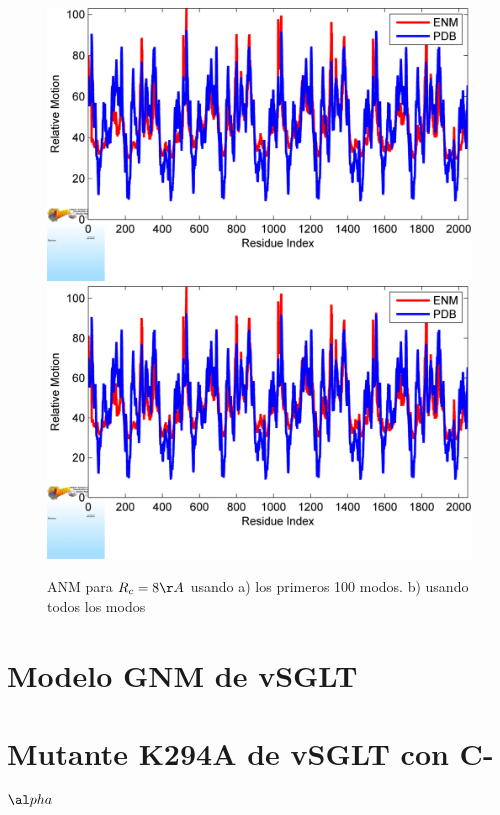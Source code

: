 \begin{figure}
 \centering
  \includegraphics[scale=0.3]{./Kap4/ANM/Ca/BF_plot_100.png}
 \includegraphics[scale=0.3]{./Kap4/ANM/Ca/BF_plot.png}
 \caption{ANM para $R_c=8\AA$ usando a) los primeros 100 modos. b) usando todos los modos}
\end{figure}
\section{Modelo GNM de vSGLT}

\section{Mutante K294A de vSGLT con C-$\al pha$}